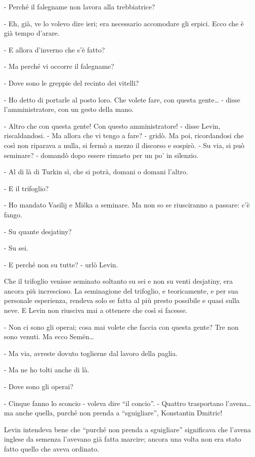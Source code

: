 - Perché il falegname non lavora alla trebbiatrice? 

- Eh, già, ve lo volevo dire ieri; era necessario accomodare gli erpici. Ecco che è già tempo d'arare. 

- E allora d'inverno che s'è fatto? 

- Ma perché vi occorre il falegname? 

- Dove sono le greppie del recinto dei vitelli? 

- Ho detto di portarle al posto loro. Che volete fare, con questa gente\ldots{} - disse l'amministratore, con un gesto della mano. 

- Altro che con questa gente! Con questo amministratore! - disse Levin, riscaldandosi. - Ma allora che vi tengo a fare? - gridò. Ma poi, ricordandosi che così non riparava a nulla, si fermò a mezzo il discorso e sospirò. - Su via, si può seminare? - domandò dopo essere rimasto per un po' in silenzio. 

- Al di là di Turkin sì, che si potrà, domani o domani l'altro. 

- E il trifoglio? 

- Ho mandato Vasilij e Miška a seminare. Ma non so se riusciranno a passare: c'è fango. 

- Su quante desjatiny? 

- Su sei. 

- E perché non su tutte? - urlò Levin. 

Che il trifoglio venisse seminato soltanto su sei e non su venti desjatiny, era ancora più increscioso. La seminagione del trifoglio, e teoricamente, e per sua personale esperienza, rendeva solo se fatta al più presto possibile e quasi sulla neve. E Levin non riusciva mai a ottenere che così si facesse. 

- Non ci sono gli operai; cosa mai volete che faccia con questa gente? Tre non sono venuti. Ma ecco Semën\ldots{} 

- Ma via, avreste dovuto toglierne dal lavoro della paglia. 

- Ma ne ho tolti anche di là. 

- Dove sono gli operai? 

- Cinque fanno lo sconcio - voleva dire ``il concio''. - Quattro trasportano l'avena\ldots{} ma anche quella, purché non prenda a ``sguigliare'', Konstantin Dmitric! 

Levin intendeva bene che ``purché non prenda a sguigliare'' significava che l'avena inglese da semenza l'avevano già fatta marcire; ancora una volta non era stato fatto quello che aveva ordinato. 

